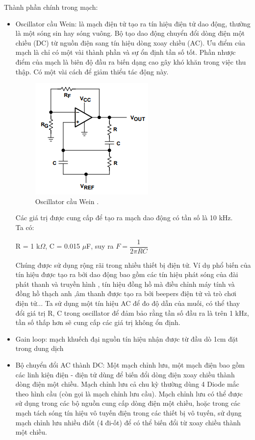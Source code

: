 \documentclass[a4paper,12pt,oneside]{article}
\begin{document}
\begin{enumerate}
\noindent Thành phần chính trong mạch:
\begin{itemize}
\item Oscillator cầu Wein: là mạch điện tử tạo ra tín hiệu điện tử dao động, thường là một sóng sin hay sóng vuông. Bộ tạo dao động chuyển đổi dòng điện một chiều (DC) từ nguồn điện sang tín hiệu dòng xoay chiều (AC). Ưu điểm của mạch là chỉ có một vài thành phần và sự ổn định tần số tốt. Phần nhược điểm của mạch là biên độ đầu ra biến dạng cao gây khó khăn trong việc thu thập. Có một vài cách để giảm thiểu tác động này.
\begin{figure}[H]
\centering
\begin{center}
\includegraphics[scale=1]{hinh/PPM/ppm_wein.png}
\end{center}
\caption{Oscillator cầu Wein \cite{electrical}.}
\end{figure}
Các giá trị được cung cấp để tạo ra mạch dao động có tần số là 10 kHz.\\
Ta có:
\begin{center}
R = 1 k$\Omega$, C = 0.015 $\mu$F, suy ra $F = \dfrac{1}{2\pi RC}$
\end{center}
Chúng được sử dụng rộng rãi trong nhiều thiết bị điện tử. Ví dụ phổ biến của tín hiệu được tạo ra bởi dao động bao gồm các tín hiệu phát sóng của đài phát thanh và truyền hình , tín hiệu đồng hồ mà điều chỉnh máy tính và đồng hồ thạch anh ,âm thanh được tạo ra bởi beepers điện tử và trò chơi điện tử... Ta sử dụng một tín hiệu AC để đo độ dẫn của muối, có thể thay đổi giá trị R, C trong oscillator để đảm bảo rằng tần số đầu ra là trên 1 kHz, tần số thấp hơn sẽ cung cấp các giá trị không ổn định.
\item	Gain loop: mạch khuếch đại nguồn tín hiệu nhận được từ đầu dò 1cm đặt trong dung dịch
\item	Bộ chuyển đổi AC thành DC:  Một mạch chỉnh lưu, một mạch điện bao gồm các linh kiện điện - điện tử dùng để biến đổi dòng điện xoay chiều thành dòng điện một chiều. Mạch chỉnh lưu cả chu kỳ thường dùng 4 Diode mắc theo hình cầu (còn gọi là mạch chỉnh lưu cầu). Mạch chỉnh lưu có thể được sử dụng trong các bộ nguồn cung cấp dòng điện một chiều, hoặc trong các mạch tách sóng tín hiệu vô tuyến điện trong các thiết bị vô tuyến, sử dụng mạch chỉnh lưu nhiều điốt (4 đi-ốt) để có thể biến đổi từ xoay chiều thành một chiều.

\end{itemize}
\end{enumerate}
\end{document}
